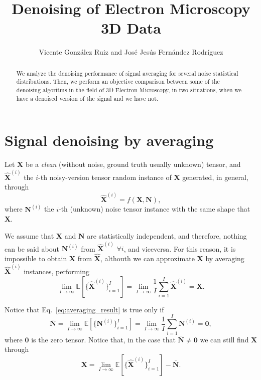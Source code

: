 \documentclass{article}
\title{Denoising of Electron Microscopy 3D Data}
\author{Vicente González Ruiz and José Jesús Fernández Rodríguez}
\begin{document}
\maketitle

\begin{abstract}
  We analyze the denoising performance of signal averaging for several
  noise statistical distributions. Then, we perform an objective
  comparison between some of the denoising algoritms in the field
  of 3D Electron Microscopy, in two situations, when we have a
  denoised version of the signal and we have not.
\end{abstract}

\section{Signal denoising by averaging}
Let $\mathbf{X}$ be a \emph{clean} (without noise, ground truth
usually unknown) tensor, and $\hat{\mathbf X}^{(i)}$ the $i$-th
noisy-version tensor random instance of $\mathbf{X}$ generated, in general, through
\begin{equation}
  \hat{\mathbf X}^{(i)} = f(\mathbf{X}, \mathbf{N}),
\end{equation}
where ${\mathbf N}^{(i)}$ the $i$-th (unknown) noise tensor instance
with the same shape that $\mathbf{X}$.

We assume that ${\mathbf X}$ and $\mathbf{N}$ are statistically
independent, and therefore, nothing can be said about
${\mathbf N}^{(i)}$ from $\hat{\mathbf X}^{(i)}$ $\forall i$, and
viceversa. For this reason, it is impossible to obtain ${\mathbf X}$
from $\hat{\mathbf X}$, althouth we can approximate ${\mathbf X}$ by
averaging $\hat{\mathbf X}^{(i)}$ instances, performing
\begin{equation}
  \lim_{I \to \infty} \mathbb{E}\left[\{\hat{\mathbf X}^{(i)}\}_{i=1}^I\right] = \lim_{I \to \infty} \frac{1}{I} \sum_{i=1}^I \hat{\mathbf X}^{(i)} = {\mathbf X}.
  \label{eq:averaging_result}
\end{equation}

Notice that Eq.~\ref{eq:averaging_result} is true only if 
\begin{equation}
  \overline{\mathbf N} = \lim_{I \to \infty}{\mathbb E}[\{{\mathbf N^{(i)}}\}_{i=1}^I]=\lim_{I \to \infty}\frac{1}{I} \sum_{i=1}^I {\mathbf N}^{(i)}={\mathbf 0},
  \label{eq:noise_expectation_2}
\end{equation}
where ${\mathbf 0}$ is the zero tensor. Notice that, in the case that $\overline{\mathbf N}\ne {\mathbf 0}$ we can still find ${\mathbf X}$ through
\begin{equation}
  {\mathbf X} = \lim_{I \to \infty} \mathbb{E}\left[\{\hat{\mathbf X}^{(i)}\}_{i=1}^I\right]  - \overline{\mathbf N}.
  \label{eq:averaging_result_with_bias}
\end{equation}
\end{document}
